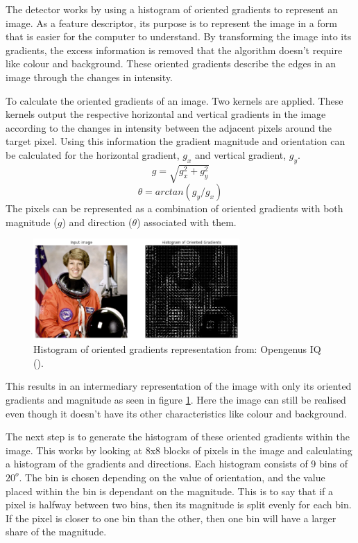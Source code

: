 \documentclass{l4proj}
\begin{document}
The detector works by using a histogram of oriented gradients to represent an image. As a feature descriptor, its purpose is to represent the image in a form that is easier for the computer to understand. By transforming the image into its gradients, the excess information is removed that the algorithm doesn't require like colour and background. These oriented gradients describe the edges in an image through the changes in intensity. 

To calculate the oriented gradients of an image. Two kernels are applied. These kernels output the respective horizontal and vertical gradients in the image according to the changes in intensity between the adjacent pixels around the target pixel. Using this information the gradient magnitude and orientation can be calculated for the horizontal gradient, \(g_x\) and vertical gradient, \(g_y\).
\[ g = \sqrt{g_x^2 + g_y^2} \]
\[ \theta = arctan (g_y/g_x) \]
The pixels can be represented as a combination of oriented gradients with both magnitude (\(g\)) and direction (\(\theta\)) associated with them.

\begin{figure}[h!]
  \centering
  \begin{minipage}{\textwidth}
  \centering
    \includegraphics[width=0.7\textwidth]{images/hog_face.png}
    \caption{Histogram of oriented gradients representation from: Opengenus IQ (\cite{hogastro}).}
    \label{hog_face}
  \end{minipage}
  \hfill
\end{figure}

This results in an intermediary representation of the image with only its oriented gradients and magnitude as seen in figure \ref{hog_face}. Here the image can still be realised even though it doesn't have its other characteristics like colour and background.

The next step is to generate the histogram of these oriented gradients within the image. This works by looking at 8x8 blocks of pixels in the image and calculating a histogram of the gradients and directions. Each histogram consists of 9 bins of \(20^o\). The bin is chosen depending on the value of orientation, and the value placed within the bin is dependant on the magnitude. This is to say that if a pixel is halfway between two bins, then its magnitude is split evenly for each bin. If the pixel is closer to one bin than the other, then one bin will have a larger share of the magnitude.
\end{document}
